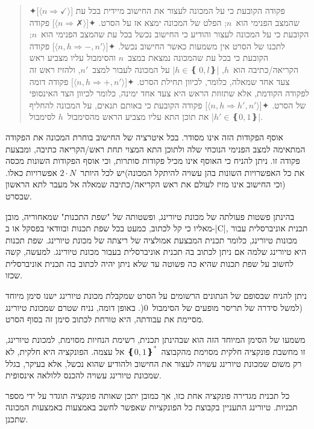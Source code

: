 \begin{quote}
\begin{enumerate}
  ✦[$⟨n⇒✓⟩$] פקודה הקובעת כי על המכונה לעצור את החישוב מיידית בכל עת שהמצב
  הפנימי הוא~$n$; הפלט של המכונה ימצא אז על הסרט.
  ✦[$⟨n⇒ ✗⟩$] פקודה הקובעת כי על המכונה לעצור והודיע כי החישוב נכשל בכל עת
    שהמצב הפנימי הוא~$n$; לתכנו של הסרט אין משמעות כאשר החישוב נכשל.
  ✦[$⟨n, h⇒-, n'⟩$] פקודה הקובעת כי בכל עת שהמכונה נמצאת במצב~$n$
    והסימבול עליו מצביע ראש הקריאה/כתיבה הוא~$h$, \E|$h∈❴~0,l❵$| על המכונה
    לעבור למצב~$n'$, ולהזיז ראש זה צעד אחד שמאלה, כלומר, לכיוון תחילת הסרט.
  ✦[$⟨n,h⇒+, n'⟩$] פקודה דומה לפקודה הקודמת, אלא שתזוזת הראש היא
    צעד אחד ימינה, כלומר לכיוון הצד האינסופי של הסרט.
  ✦[$⟨n,h⇒ h', n'⟩$] פקודה הקובעת כי באותם תנאים, על המכונה להחליף את תוכן התא
  עליו מצביע הראש מהסימבול~$h$ לסימבול \E|$h'∈❴0,1❵$|.
\end{enumerate}
\end{quote}
אוסף הפקודות הזה אינו מסודר. בכל איטרציה של החישוב בוחרת המכונה את הפקודה
המתאימה למצב הפנימי הנוכחי שלה ולתוכן התא המצוי תחת ראש/הקריאה כתיבה, ומבצעת
פקודה זו. ניתן להניח כי האוסף אינו מכיל פקודות סותרות, וכי אוסף הפקודות השונות
מכסה את כל האפשרויות השונות בהן עשויה להיתקל המכונה)יש לכל היותר~$2·N$
אפשרויות כאלו.(וכי החישוב אינו מזיז לעולם את ראש הקריאה/כתיבה שמאלה אל מעבר
לתא הראשון שבסרט.

בהינתן פשטות פעולתה של מכונת טיורינג, ופשטותה של "שפת התכנות" שמאחוריה, מובן
מאליו כי קל לכתוב, כמעט בכל שפת תכנות ובוודאי בפסקל או ב-\E|C|, תכנית
אוניברסלית עבור מכונות טיורינג, כלומר תכנית המבצעת אמולציה של ריצתה של מכונת
טיורינג. שפת תכנות היא טיורינג שלמה אם ניתן לכתוב בה תכנית אוניברסלית בעבור
מכונת טיורינג. למעשה, קשה לחשוב על שפת תכנות שהיא כה פשוטה עד שלא ניתן יהיה
לכתוב בה תכנית אוניברסלית שכזו.

ניתן להניח שבסופם של הנתונים הרשומים על הסרט שמקבלת מכונת טיורינג ישנו סימן
מיוחד (למשל סידרה של תריסר מופעים של הסימבול~$0$(. באופן דומה, נניח שטרם שמכונת
טיורינג מסיימת את עבודתה, היא טורחת לכתוב סימן זה בסוף הסרט.

משמעו של הסימן המיוחד הזה הוא שבהינתן תכנית, רשימת הנחיות מסוימת, למכונת
טיורינג, זו מחשבת פונקציה חלקית מסוימת מהקבוצה~$❴0,1❵^*$ אל עצמה. הפונקציה
היא חלקית, לא רק משום שמכונת טיורינג עשויה לעצור את החישוב ולהודיע שהוא נכשל,
אלא בעיקר, בגלל שמכונת טיורינג עשויה להכנס ללולאה אינסופית.

כל תכנית מגדירה פונקציה אחת כזו, אך כמובן יתכן שאותה פונקציה תוגדר על ידי מספר
תכניות. טיורינג התעניין בקבוצת כל הפונקציות שאפשר לחשב באמצעות באמצעות המכונה
שתכנן.

